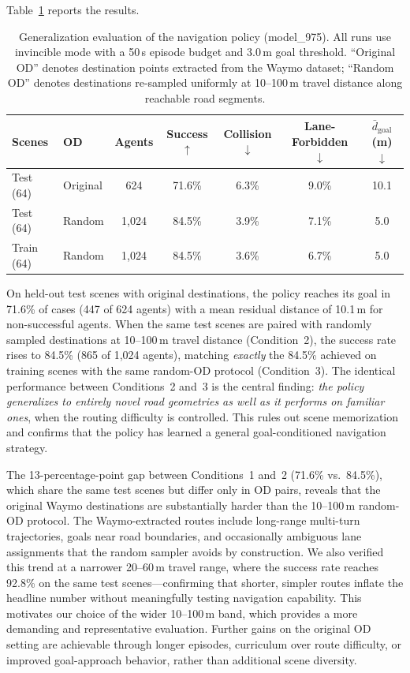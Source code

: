 Table~\ref{tab:generalization} reports the results.

\begin{table}[t]
\centering
\caption{Generalization evaluation of the navigation policy (model\_975).
All runs use invincible mode with a 50\,s episode budget and 3.0\,m goal threshold.
``Original OD'' denotes destination points extracted from the Waymo dataset;
``Random OD'' denotes destinations re-sampled uniformly at 10--100\,m travel distance along reachable road segments.}
\label{tab:generalization}
\small
\begin{tabular}{llccccc}
\toprule
Scenes & OD & Agents & Success $\uparrow$ & Collision $\downarrow$ & Lane-Forbidden $\downarrow$ & $\bar{d}_\text{goal}$ (m) $\downarrow$ \\
\midrule
Test (64)   & Original & 624   & 71.6\% & 6.3\% & 9.0\% & 10.1 \\
Test (64)   & Random   & 1{,}024 & 84.5\% & 3.9\% & 7.1\% & 5.0 \\
Train (64)  & Random   & 1{,}024 & 84.5\% & 3.6\% & 6.7\% & 5.0 \\
\bottomrule
\end{tabular}
\end{table}

On held-out test scenes with original destinations, the policy reaches its goal in 71.6\% of cases (447 of 624 agents) with a mean residual distance of 10.1\,m for non-successful agents.
When the same test scenes are paired with randomly sampled destinations at 10--100\,m travel distance (Condition~2), the success rate rises to 84.5\% (865 of 1{,}024 agents), matching \emph{exactly} the 84.5\% achieved on training scenes with the same random-OD protocol (Condition~3).
The identical performance between Conditions~2 and~3 is the central finding: \emph{the policy generalizes to entirely novel road geometries as well as it performs on familiar ones}, when the routing difficulty is controlled.
This rules out scene memorization and confirms that the policy has learned a general goal-conditioned navigation strategy.

The 13-percentage-point gap between Conditions~1 and~2 (71.6\% vs.\ 84.5\%), which share the same test scenes but differ only in OD pairs, reveals that the original Waymo destinations are substantially harder than the 10--100\,m random-OD protocol.
The Waymo-extracted routes include long-range multi-turn trajectories, goals near road boundaries, and occasionally ambiguous lane assignments that the random sampler avoids by construction.
We also verified this trend at a narrower 20--60\,m travel range, where the success rate reaches 92.8\% on the same test scenes---confirming that shorter, simpler routes inflate the headline number without meaningfully testing navigation capability.
This motivates our choice of the wider 10--100\,m band, which provides a more demanding and representative evaluation.
Further gains on the original OD setting are achievable through longer episodes, curriculum over route difficulty, or improved goal-approach behavior, rather than additional scene diversity.


